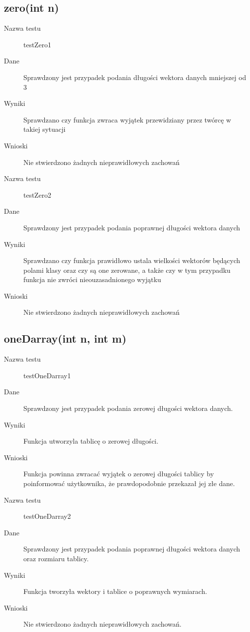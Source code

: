 \documentclass[12pt,a4paper,notitlepage]{article}
\begin{document}
\subsection{zero(int n)}
\begin{description}
\item [Nazwa testu] testZero1
\item [Dane] Sprawdzony jest przypadek podania długości wektora danych mniejszej od 3
\item [Wyniki] Sprawdzano czy funkcja zwraca wyjątek przewidziany przez twórcę w takiej sytuacji
\item [Wnioski] Nie stwierdzono żadnych nieprawidłowych zachowań
\end{description}
\vspace*{5mm}
\begin{description}
\item [Nazwa testu] testZero2
\item [Dane] Sprawdzony jest przypadek podania poprawnej długości wektora danych
\item [Wyniki] Sprawdzano czy funkcja prawidłowo ustala wielkości wektorów będących polami klasy oraz czy są one zerowane, a także czy w tym przypadku funkcja nie zwróci nieouzasadnionego wyjątku
\item [Wnioski] Nie stwierdzono żadnych nieprawidłowych zachowań
\end{description}
\subsection{oneDarray(int n, int m)}
\begin{description}
\item [Nazwa testu] testOneDarray1
\item [Dane] Sprawdzony jest przypadek podania zerowej długości wektora danych.
\item [Wyniki] Funkcja utworzyla tablicę o zerowej długości.
\item [Wnioski] Funkcja powinna zwracać wyjątek o zerowej długości tablicy by poinformować użytkownika, że prawdopodobnie przekazał jej złe dane.
\end{description}
\vspace*{5mm}
\begin{description}
\item [Nazwa testu] testOneDarray2
\item [Dane] Sprawdzony jest przypadek podania poprawnej długości wektora danych oraz rozmiaru tablicy.
\item [Wyniki] Funkcja tworzyła wektory i tablice o poprawnych wymiarach.
\item [Wnioski] Nie stwierdzono żadnych nieprawidłowych zachowań.
\end{description}
\end{document}
